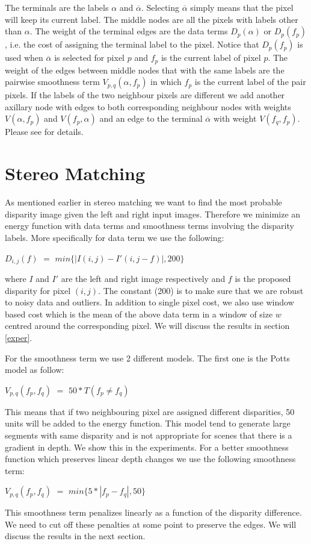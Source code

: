 \documentclass[letterpaper, 10 pt, conference]{ieeeconf}  %
\begin{document}
The terminals are the labels $\alpha$ and $\overline{\alpha}$. Selecting $\overline{\alpha}$ simply means that the pixel will keep its current label. The middle nodes are all the pixels with labels other than $\alpha$. The weight of the terminal edges are the data terms $D_p(\alpha)$ or $D_p(f_p)$, i.e. the cost of assigning the terminal label to the pixel. Notice that $D_p(f_p)$ is used when $\overline{\alpha}$ is selected for pixel $p$ and $f_p$ is the current label of pixel $p$. The weight of the edges between middle nodes that with the same labels are the pairwise smoothness term $V_{p,q}(\alpha,f_p)$ in which $f_p$ is the current label of the pair pixels. If the labels of the two neighbour pixels are different we add another axillary node with edges to both corresponding neighbour nodes with weights $V(\alpha,f_p)$ and $V(f_p, \alpha)$ and an edge to the terminal $\overline{\alpha}$ with weight $V(f_q,f_p)$. Please see \cite{boykov2001fast} for details.

\section{Stereo Matching}
As mentioned earlier in stereo matching we want to find the most probable disparity image given the left and right input images. Therefore we minimize an energy function with data terms and smoothness terms involving the disparity labels. More specifically for data term we use the following:
\begin{center}
$D_{i,j}(f)$ $=$ $min\{|I(i,j)-I'(i,j-f)|,200\}$
\end{center}
where $I$ and $I'$ are the left and right image respectively and $f$ is the proposed disparity for pixel $(i,j)$. The constant (200) is to make sure that we are robust to noisy data and outliers. In addition to single pixel cost, we also use window based cost which is the mean of the above data term in a window of size $w$ centred around the corresponding pixel. We will discuss the results in section \ref{exper}.

For the smoothness term we use 2 different models. The first one is the Potts model as follow:
\begin{center}
$V_{p,q}(f_p,f_q)$ $=$ $50*T(f_p \neq f_q)$
\end{center}
This means that if two neighbouring pixel are assigned different disparities, 50 units will be added to the energy function. This model tend to generate large segments with same disparity and is not appropriate for scenes that there is a gradient in depth. We show this in the experiments. For a better smoothness function which preserves linear depth changes we use the following smoothness term: 
\begin{center}
$V_{p,q}(f_p,f_q)$ $=$ $min\{5*|f_p - f_q|,50\}$
\end{center}
This smoothness term penalizes linearly as a function of the disparity difference. We need to cut off these penalties at some point to preserve the edges. We will discuss the results in the next section.
\end{document}
